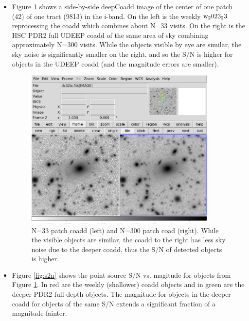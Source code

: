 \begin{itemize}
\item Figure \ref{fig:coadd} shows a side-by-side deepCoadd image of the center of one patch (42) of one tract
(9813) in the i-band.  On the left is the weekly $\rm w_2023_23$ reprocessing the coadd which combines about
N=33 visits.  On the right is the HSC PDR2 full UDEEP coadd of the same area of sky combining approximately
N=300 visits.   While the objects visible by eye are similar, the sky noise is significantly smaller on the
right, and so the S/N is higher for objects in the UDEEP coadd (and the magnitude errors are smaller).

 \begin{figure}[h]
 \includegraphics[width=0.9\textwidth]{sidebyside9813p42bi.png}
	 \caption{N=33 patch coadd (left) and N=300 patch coad (right).  While the visible objects are similar, the coadd to the right has less sky noise due to the deeper coadd, thus the S/N of detected objects is higher.  \label{fig:coadd}}
 \end{figure}


\item Figure \ref{fig:s2n} shows the point source S/N vs. magitude for objects from Figure \ref{fig:coadd}.  In red are the weekly (shallower) coadd objects and in green are the deeper PDR2 full depth objects.   The
magnitude for objects in the deeper coadd for objects of the same S/N extends a significant 
fraction of a magnitude fainter.


\end{itemize}
